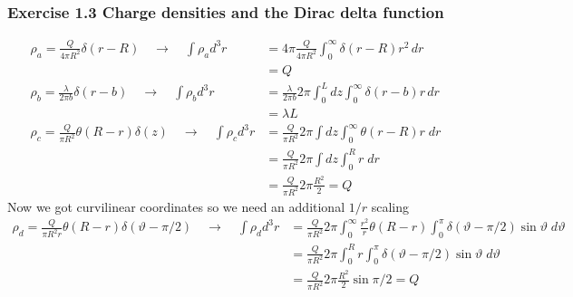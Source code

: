 \documentclass[10pt,a4paper]{article}
\theoremstyle{definition}
\begin{document}
\subsubsection{Exercise 1.3 Charge densities and the Dirac delta function}
\begin{align}
\rho_a=\frac{Q}{4\pi R^2}\delta(r-R)\quad\rightarrow\quad \int\rho_a d^3r&=4\pi\frac{Q}{4\pi R^2}\int_0^\infty\delta(r-R)r^2\,dr\\&=Q\\
\rho_b=\frac{\lambda}{2\pi b}\delta(r-b)\quad\rightarrow\quad \int\rho_b d^3r&=\frac{\lambda}{2\pi b}2\pi\int_0^Ldz\int_0^\infty \delta(r-b)r\,dr\\&=\lambda L\\
\rho_c=\frac{Q}{\pi R^2}\theta(R-r)\delta(z)\quad\rightarrow\quad \int\rho_c d^3r&=\frac{Q}{\pi R^2}2\pi\int dz\int_0^\infty\theta(r-R)r\;dr\\
&=\frac{Q}{\pi R^2}2\pi\int dz\int_0^Rr\;dr\\
&=\frac{Q}{\pi R^2}2\pi\frac{R^2}{2}=Q
\end{align}
Now we got curvilinear coordinates so we need an additional $1/r$ scaling
\begin{align}
\rho_d=\frac{Q}{\pi R^2r}\theta(R-r)\delta(\vartheta-\pi/2)\quad\rightarrow\quad \int\rho_d d^3r&=\frac{Q}{\pi R^2}2\pi\int_0^\infty \frac{r^2}{r}\theta(R-r)\int_0^\pi\delta(\vartheta-\pi/2)\sin\vartheta\;d\vartheta\\
&=\frac{Q}{\pi R^2}2\pi\int_0^R r\int_0^\pi\delta(\vartheta-\pi/2)\sin\vartheta\;d\vartheta\\
&=\frac{Q}{\pi R^2}2\pi \frac{R^2}{2}\sin\pi/2=Q
\end{align}
\end{document}
